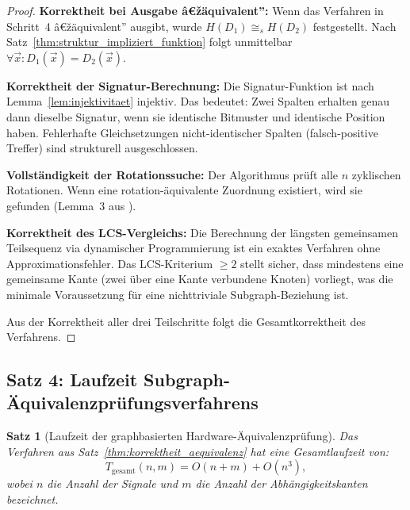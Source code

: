 ﻿\documentclass[12pt,a4paper]{report}
\newtheorem{theorem}{Satz}[section]
\begin{document}
\begin{proof}
\textbf{Korrektheit bei Ausgabe â€žäquivalent'':} Wenn das Verfahren in Schritt~4 â€žäquivalent'' ausgibt, wurde $H(D_1) \cong_s H(D_2)$ festgestellt. Nach Satz~\ref{thm:struktur_impliziert_funktion} folgt unmittelbar $\forall \vec{x} : D_1(\vec{x}) = D_2(\vec{x})$.

\textbf{Korrektheit der Signatur-Berechnung:} Die Signatur-Funktion ist nach Lemma~\ref{lem:injektivitaet} injektiv. Das bedeutet: Zwei Spalten erhalten genau dann dieselbe Signatur, wenn sie identische Bitmuster und identische Position haben. Fehlerhafte Gleichsetzungen nicht-identischer Spalten (falsch-positive Treffer) sind strukturell ausgeschlossen.

\textbf{Vollständigkeit der Rotationssuche:} Der Algorithmus prüft alle $n$ zyklischen Rotationen. Wenn eine rotation-äquivalente Zuordnung existiert, wird sie gefunden (Lemma~3 aus \cite{subgraph2026}).

\textbf{Korrektheit des LCS-Vergleichs:} Die Berechnung der längsten gemeinsamen Teilsequenz via dynamischer Programmierung ist ein exaktes Verfahren ohne Approximationsfehler. Das LCS-Kriterium $\geq 2$ stellt sicher, dass mindestens eine gemeinsame Kante (zwei über eine Kante verbundene Knoten) vorliegt, was die minimale Voraussetzung für eine nichttriviale Subgraph-Beziehung ist.

Aus der Korrektheit aller drei Teilschritte folgt die Gesamtkorrektheit des Verfahrens.
\end{proof}

\subsection{Satz 4: Laufzeit Subgraph-Äquivalenzprüfungsverfahrens}

\begin{theorem}[Laufzeit der graphbasierten Hardware-Äquivalenzprüfung]
\label{thm:laufzeit_aequivalenz}
Das Verfahren aus Satz~\ref{thm:korrektheit_aequivalenz} hat eine Gesamtlaufzeit von:
\[
T_{\mathrm{gesamt}}(n, m) = O(n + m) + O(n^3),
\]
wobei $n$ die Anzahl der Signale und $m$ die Anzahl der Abhängigkeitskanten bezeichnet.
\end{theorem}
\end{document}
